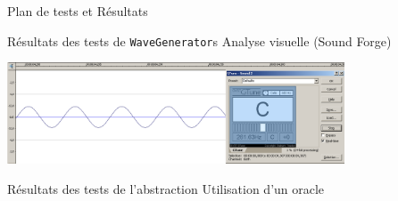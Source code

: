\documentclass[frenchb]{beamer}
\begin{document}
\begin{frame}{Plan de tests et Résultats}
    \begin{block}{Résultats des tests de \texttt{WaveGenerator}s}
        Analyse visuelle (Sound Forge)
        \begin{center}
            \includegraphics[width=10cm]{../img/png/testWaveGeneratorSinus.png}
        \end{center}
    \end{block}

    \begin{block}{Résultats des tests de l'abstraction}
        Utilisation d’un oracle
    \end{block}
\end{frame}
\end{document}
